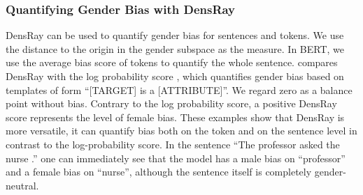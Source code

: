 \subsubsection*{Quantifying Gender Bias with DensRay}
DensRay can be used to quantify gender bias for sentences
and tokens. We use the distance to the origin in the gender
subspace as the measure. In BERT, we use the average
bias score of tokens to quantify the whole
sentence.  compares DensRay with the log
probability score \cite{kurita2019measuring}, which
quantifies gender bias based on templates of form ``[TARGET]
is a [ATTRIBUTE]''. We regard zero as a balance point
without bias. Contrary to the log probability score, a
positive DensRay score represents the level of female
bias. These examples show that DensRay is more versatile, it
can quantify  bias both on the token and on the sentence level in contrast to the log-probability score.
In the sentence ``The professor asked the nurse .'' one can immediately see that the model has a male bias on ``professor'' and a female bias on ``nurse'', although the sentence itself
is completely gender-neutral.

